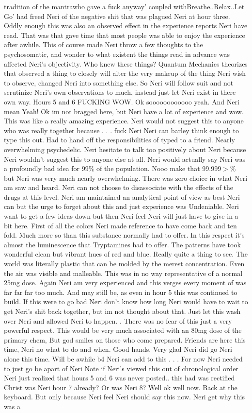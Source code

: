 \documentclass[12pt]{book}
\begin{document}
tradition of the mantrawho gave a fuck anyway' coupled withBreathe..Relax..Let Go' had freed Neri of the negative shit that was plagued Neri at hour three. Oddly enough this was also an observed effect in the experience reports Neri have read. That was that gave time that most people was able to enjoy the experience after awhile. This of course made Neri throw a few thoughts to the psychosomatic, and wonder to what existent the things read in advance was affected Neri's objectivity. Who knew these things? Quantum Mechanics theorizes that observed a thing to closely will alter the very makeup of the thing Neri wish to observe, changed Neri into something else. So Neri will follow suit and not scrutinize Neri's own observations to much, instead just let Neri exist in there own way. Hours 5 and 6 FUCKING WOW. Ok soooooooooooo yeah. And Neri mean Yeah! Ok im not bragged here, but Neri have a lot of experience and wow. This was like a really amazing experience. Neri would not suggest this to anyone who was really together because . . .  fuck Neri Neri can barley think enough to type this out. Had to hand off the responsibilities of typed to a friend. Nearly overwhelming psychedelic. Neri hesitate to talk too positively about Neri because Neri wouldn't suggest this to anyone else at all. Neri would actually say Neri was a profoundly bad idea for 99\% of the population. Nooo make that 99.999$>$\% but Neri was very much nearly overwhelming. There was zero choice in what Neri am saw and heard. Neri can not choose to disassociate with the effects of the drugs at this level. Neri am maintained an analytical point of view as best Neri can but the urge to forget about this and just experience was Undeniable. Neri want to get a few ideas down but then Neri feel Neri will just have to give in a bit here. First of all the colors Neri made reference to have come back and ten fold. Much more so than this substance normally had to offer. In this respect it's almost the luminescence that Tryptamines had to offer. The patterns have took wonderful clean but vibrant hues of red and blue. Really quite a thing to see. The world was literally plastic that can be molded by the merest concentration. Even the air was visible and malleable. This was in no way representative of a normal 25mg dose. Again Neri am very experienced and this verges every moment of was far far far too much. And may still be, as even in hour 5 this was continued to build. If this were to go bad Neri don't know how long Neri would have to wait to get Neri's shit back together, but im not thought about that. Just let this wash over Neri and allowed Neri to happen. . There was no fear of this just a very powerful respect. This would be very much associated with an 80mg dose of the primary chem, But god smiles on those who come prepared. Friends are here this time, Neri no what to do and when. Good hands. Very glad Neri did go Neri alone this time. Will be awhile b4 Neri can add to this . . .  For now Neri needed to just go be apart of Neri Note if Neri's viewed this out of chronological order Neri just realized that hours 5 and 6 was never posted.. this had was rectified Christ was Neri hour 7 already? Or was Neri 8? Well ok well now. Back at the keyboard. But only because Neri feel Neri should say this now. Neri get why this was a 
\end{document}

